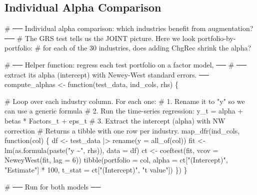 \documentclass[
  letterpaper,
  DIV=11,
  numbers=noendperiod]{scrartcl}
\newenvironment{Shaded}{\begin{snugshade}}{\end{snugshade}}
\newcommand{\AttributeTok}[1]{\textcolor[rgb]{0.40,0.45,0.13}{#1}}
\newcommand{\CommentTok}[1]{\textcolor[rgb]{0.37,0.37,0.37}{#1}}
\newcommand{\ControlFlowTok}[1]{\textcolor[rgb]{0.00,0.23,0.31}{#1}}
\newcommand{\DecValTok}[1]{\textcolor[rgb]{0.68,0.00,0.00}{#1}}
\newcommand{\FunctionTok}[1]{\textcolor[rgb]{0.28,0.35,0.67}{#1}}
\newcommand{\NormalTok}[1]{\textcolor[rgb]{0.00,0.23,0.31}{#1}}
\newcommand{\OtherTok}[1]{\textcolor[rgb]{0.00,0.23,0.31}{#1}}
\newcommand{\SpecialCharTok}[1]{\textcolor[rgb]{0.37,0.37,0.37}{#1}}
\newcommand{\StringTok}[1]{\textcolor[rgb]{0.13,0.47,0.30}{#1}}
\begin{document}
\subsection{Individual Alpha
Comparison}\label{individual-alpha-comparison}

\begin{Shaded}
\begin{Highlighting}[]
\CommentTok{\# ── Individual alpha comparison: which industries benefit from augmentation? ──}
\CommentTok{\# The GRS test tells us the JOINT picture. Here we look portfolio{-}by{-}portfolio:}
\CommentTok{\# for each of the 30 industries, does adding ChgRec shrink the alpha?}

\CommentTok{\# ── Helper function: regress each test portfolio on a factor model, ──}
\CommentTok{\# ── extract its alpha (intercept) with Newey{-}West standard errors.  ──}
\NormalTok{compute\_alphas }\OtherTok{\textless{}{-}} \ControlFlowTok{function}\NormalTok{(test\_data, ind\_cols, rhs) \{}
  
  \CommentTok{\# Loop over each industry column. For each one:}
  \CommentTok{\# 1. Rename it to "y" so we can use a generic formula}
  \CommentTok{\# 2. Run the time{-}series regression: y\_t = alpha + betas * Factors\_t + eps\_t}
  \CommentTok{\# 3. Extract the intercept (alpha) with NW correction}
  \CommentTok{\# Returns a tibble with one row per industry.}
  \FunctionTok{map\_dfr}\NormalTok{(ind\_cols, }\ControlFlowTok{function}\NormalTok{(col) \{}
\NormalTok{    df }\OtherTok{\textless{}{-}}\NormalTok{ test\_data }\SpecialCharTok{|\textgreater{}} \FunctionTok{rename}\NormalTok{(}\AttributeTok{y =} \FunctionTok{all\_of}\NormalTok{(col))}
\NormalTok{    fit }\OtherTok{\textless{}{-}} \FunctionTok{lm}\NormalTok{(}\FunctionTok{as.formula}\NormalTok{(}\FunctionTok{paste}\NormalTok{(}\StringTok{"y \textasciitilde{}"}\NormalTok{, rhs)), }\AttributeTok{data =}\NormalTok{ df)}
\NormalTok{    ct }\OtherTok{\textless{}{-}} \FunctionTok{coeftest}\NormalTok{(fit, }\AttributeTok{vcov =} \FunctionTok{NeweyWest}\NormalTok{(fit, }\AttributeTok{lag =} \DecValTok{6}\NormalTok{))}
    \FunctionTok{tibble}\NormalTok{(}\AttributeTok{portfolio =}\NormalTok{ col,}
           \AttributeTok{alpha =}\NormalTok{ ct[}\StringTok{"(Intercept)"}\NormalTok{, }\StringTok{"Estimate"}\NormalTok{] }\SpecialCharTok{*} \DecValTok{100}\NormalTok{,}
           \AttributeTok{t\_stat =}\NormalTok{ ct[}\StringTok{"(Intercept)"}\NormalTok{, }\StringTok{"t value"}\NormalTok{])}
\NormalTok{  \})}
\NormalTok{\}}

\CommentTok{\# ── Run for both models ──}


\end{Highlighting}
\end{Shaded}
\end{document}
